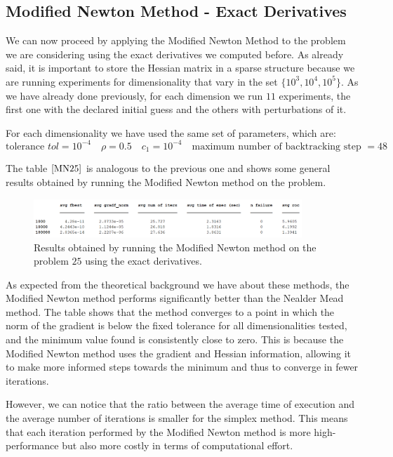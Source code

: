 \medskip
\subsection*{Modified Newton Method - Exact Derivatives}
We can now proceed by applying the Modified Newton Method to the problem we are considering using the exact derivatives we computed before. As already said, it is important to store the Hessian matrix in a sparse structure because we are running experiments for dimensionality that vary in the set $\{10^3, 10^4, 10^5\}$. 
As we have already done previously, for each dimension we run $11$ experiments, the first one with the declared initial guess and the others with perturbations of it.

For each dimensionality we have used the same set of parameters, which are:
\begin{equation*}
    \text{tolerance } tol = 10^{-4}  \quad
    \rho = 0.5 \quad 
    c_1 = 10^{-4} \quad
    \text{maximum number of backtracking step } = 48
\end{equation*}

The table $\eqref{MN25}$ is analogous to the previous one and shows some general results obtained by running the Modified Newton method on the problem.
\begin{figure}[htbp]
    \centering
    \includegraphics[width = 0.9\textwidth]{img/pb25_MN_table.png}
    \caption{Results obtained by running the Modified Newton method on the problem $25$ using the exact derivatives.}
    \label{MN25}
\end{figure}

As expected from the theoretical background we have about these methods, the Modified Newton method performs significantly better than the Nealder Mead method. The table shows that the method converges to a point in which the norm of the gradient is below the fixed tolerance for all dimensionalities tested, and the minimum value found is consistently close to zero. 
This is because the Modified Newton method uses the gradient and Hessian information, allowing it to make more informed steps towards the minimum and thus to converge in fewer iterations.

However, we can notice that the ratio between the average time of execution and the average number of iterations is smaller for the simplex method. This means that each iteration performed by the Modified Newton method is more high-performance but also more costly in terms of computational effort. 

